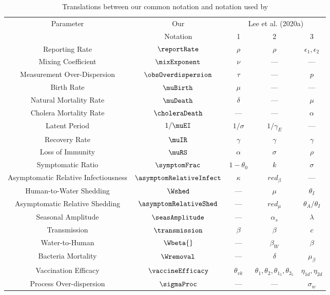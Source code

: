 \begin{table}
  \begin{center}
  \begin{tabular}{|c|c|c|c|c|}\hline
    \multirow{2}{*}{Parameter} & Our & \multicolumn{3}{c|}{Lee et al. (2020a)} \\\cline{3-5}
     & Notation & 1 & 2 & 3 \\
    \hline
    \hline
    Reporting Rate & $\reportRate$ & $\rho$ & $\rho$ & $\epsilon_1, \epsilon_2$ \\\hline
    Mixing Coefficient & $\mixExponent$ & $\nu$ & --- & --- \\\hline
    Measurement Over-Dispersion & $\obsOverdispersion$ & $\tau$ & --- & $p$ \\\hline
    Birth Rate & $\muBirth$ & $\mu$ & --- & --- \\\hline
    Natural Mortality Rate & $\muDeath$ & $\delta$ & --- & $\mu$ \\\hline
    Cholera Mortality Rate & $\choleraDeath$ & --- & --- & $\alpha$ \\\hline
    Latent Period & $1/\muEI$ & $1/\sigma$ & $1/\gamma_E$ & --- \\\hline
    Recovery Rate & $\muIR$ & $\gamma$ & $\gamma$ & $\gamma$ \\\hline
    Loss of Immunity & $\muRS$ & $\alpha$ & $\sigma$ & $\rho$ \\\hline
    Symptomatic Ratio & $\symptomFrac$ & $1 - \theta_0$ & $k$ & $\sigma$ \\\hline
    Asymptomatic Relative Infectiousness & $\asymptomRelativeInfect$ & $\kappa$ & $red_\beta$ & --- \\\hline
    Human-to-Water Shedding & $\Wshed$ & --- & $\mu$ & $\theta_I$ \\\hline
    Asymptomatic Relative Shedding & $\asymptomRelativeShed$ & --- & $red_\mu$ & $\theta_A/\theta_I$ \\\hline
    Seasonal Amplitude & $\seasAmplitude$ & --- & $\alpha_s$ & $\lambda$ \\\hline
    Transmission & $\transmission$ & $\beta$ & $\beta$ & $c$ \\\hline
    Water-to-Human & $\Wbeta{}$ & --- & $\beta_W$ & $\beta$ \\\hline
    Bacteria Mortality & $\Wremoval$ & --- & $\delta$ & $\mu_\beta$ \\\hline
    Vaccination Efficacy & $\vaccineEfficacy$ & $\theta_{vk}$ & $\theta_1, \theta_2, \theta_{1_5}, \theta_{2_5}$ & $\eta_{1d}, \eta_{2d}$ \\\hline
    Process Over-dispersion & $\sigmaProc$ & --- & --- & $\sigma_w$\\\hline
  \end{tabular}
  \end{center}
  \caption{
  \label{tab:translate}Translations between our common notation and notation used by \cite{lee20}
  }
\end{table}
